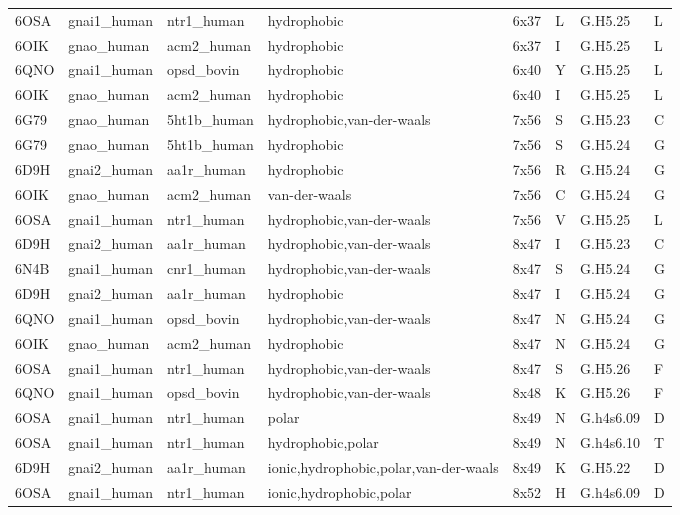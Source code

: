 \begin{landscape}
\begin{longtable}{llllllll}
6OSA & gnai1\_human & ntr1\_human & hydrophobic & 6x37 & L & G.H5.25 & L\\
6OIK & gnao\_human & acm2\_human & hydrophobic & 6x37 & I & G.H5.25 & L\\
6QNO & gnai1\_human & opsd\_bovin & hydrophobic & 6x40 & Y & G.H5.25 & L\\
\addlinespace
6OIK & gnao\_human & acm2\_human & hydrophobic & 6x40 & I & G.H5.25 & L\\
6G79 & gnao\_human & 5ht1b\_human & hydrophobic,van-der-waals & 7x56 & S & G.H5.23 & C\\
6G79 & gnao\_human & 5ht1b\_human & hydrophobic & 7x56 & S & G.H5.24 & G\\
6D9H & gnai2\_human & aa1r\_human & hydrophobic & 7x56 & R & G.H5.24 & G\\
6OIK & gnao\_human & acm2\_human & van-der-waals & 7x56 & C & G.H5.24 & G\\
\addlinespace
6OSA & gnai1\_human & ntr1\_human & hydrophobic,van-der-waals & 7x56 & V & G.H5.25 & L\\
6D9H & gnai2\_human & aa1r\_human & hydrophobic,van-der-waals & 8x47 & I & G.H5.23 & C\\
6N4B & gnai1\_human & cnr1\_human & hydrophobic,van-der-waals & 8x47 & S & G.H5.24 & G\\
6D9H & gnai2\_human & aa1r\_human & hydrophobic & 8x47 & I & G.H5.24 & G\\
6QNO & gnai1\_human & opsd\_bovin & hydrophobic,van-der-waals & 8x47 & N & G.H5.24 & G\\
\addlinespace
6OIK & gnao\_human & acm2\_human & hydrophobic & 8x47 & N & G.H5.24 & G\\
6OSA & gnai1\_human & ntr1\_human & hydrophobic,van-der-waals & 8x47 & S & G.H5.26 & F\\
6QNO & gnai1\_human & opsd\_bovin & hydrophobic,van-der-waals & 8x48 & K & G.H5.26 & F\\
6OSA & gnai1\_human & ntr1\_human & polar & 8x49 & N & G.h4s6.09 & D\\
6OSA & gnai1\_human & ntr1\_human & hydrophobic,polar & 8x49 & N & G.h4s6.10 & T\\
\addlinespace
6D9H & gnai2\_human & aa1r\_human & ionic,hydrophobic,polar,van-der-waals & 8x49 & K & G.H5.22 & D\\
6OSA & gnai1\_human & ntr1\_human & ionic,hydrophobic,polar & 8x52 & H & G.h4s6.09 & D\\*
\end{longtable}
\end{landscape}
